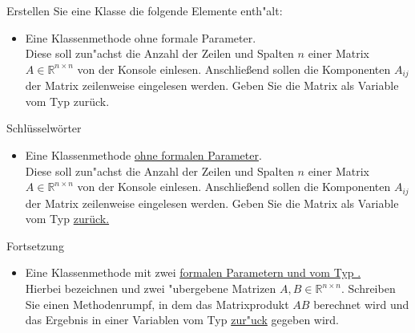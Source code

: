 \documentclass[9pt,german]{beamer}%
\begin{document}
\begin{frame}
Erstellen Sie eine Klasse  die folgende Elemente enth"alt:
\begin{itemize}
  \item Eine Klassenmethode  ohne formale Parameter.\\
  Diese soll zun"achst die Anzahl der Zeilen und Spalten $n$ einer Matrix $A\in\mathbb R^{n \times n}$ von
  der Konsole einlesen. Anschlie\ss end sollen die Komponenten $A_{ij}$ der Matrix zeilenweise eingelesen
  werden. Geben Sie die Matrix als Variable vom Typ  zur\"uck.
\end{itemize}
\end{frame}

\begin{frame}
Schl\"usselw\"orter
\begin{itemize}
  \item Eine Klassenmethode  \underline{ohne formalen Parameter}.\\
  Diese soll zun"achst die Anzahl der Zeilen und Spalten $n$ einer Matrix $A\in\mathbb R^{n \times n}$ von
  der Konsole einlesen. Anschlie\ss end sollen die Komponenten $A_{ij}$ der Matrix zeilenweise eingelesen
  werden. Geben Sie die Matrix als Variable vom Typ \underline{ zur\"uck.}
\end{itemize}
\end{frame}


\begin{frame}
Fortsetzung
\begin{itemize}
  \item Eine Klassenmethode  mit zwei \underline{formalen Parametern  und 
  vom Typ .}\\
  Hierbei bezeichnen  und  zwei "ubergebene Matrizen
  $A,B\in\mathbb R^{n\times n}$. Schreiben Sie einen Methodenrumpf, in dem das Matrixprodukt $AB$ berechnet
  wird und das Ergebnis in einer Variablen vom Typ \underline{ zur"uck} gegeben wird.
\end{itemize}
\end{frame}
\end{document}
